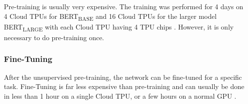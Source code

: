 Pre-training is usually very expensive.
The training was performed for 4 days on 4 Cloud TPUs for BERT\textsubscript{BASE} and 16 Cloud TPUs for the larger model BERT\textsubscript{LARGE} with each Cloud TPU having 4 TPU chips \cite[p.~13]{devlin2018bert}.
However, it is only necessary to do pre-training once.

\subsubsection{Fine-Tuning}

After the unsupervised pre-training, the network can be fine-tuned for a specific task.
Fine-Tuning is far less expensive than pre-training and can usually be done in less than 1 hour on a single Cloud TPU, or a few hours on a normal GPU \cite[p.~5]{devlin2018bert}.
